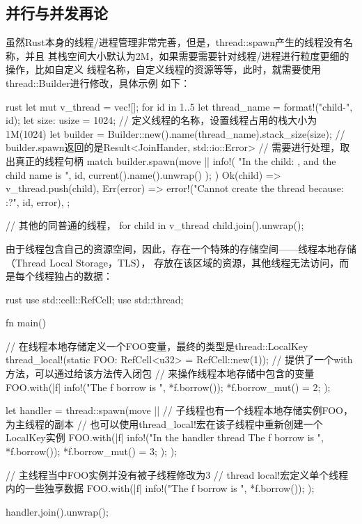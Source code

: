 \subsection{并行与并发再论}
虽然Rust本身的线程/进程管理非常完善，但是，thread::spawn产生的线程没有名称，并且
其栈空间大小默认为2M，如果需要需要针对线程/进程进行粒度更细的操作，比如自定义
线程名称，自定义线程的资源等等，此时，就需要使用thread::Builder进行修改，具体示例
如下：
\begin{code-block}{rust}
let mut v_thread = vec![];
for id in 1..5 {
    let thread_name = format!("child-{}", id);
    let size: usize = 1024;
    // 定义线程的名称，设置线程占用的栈大小为1M(1024)
    let builder = Builder::new().name(thread_name).stack_size(size);
    // builder.spawn返回的是Result<JoinHander, std::io::Error>
    // 需要进行处理，取出真正的线程句柄
    match builder.spawn(move || {
        info!(
            "In the child: {}, and the child name is {}",
            id,
            current().name().unwrap()
        );
    }) {
        Ok(child) => v_thread.push(child),
        Err(error) => error!("Cannot create the thread {} because: {:?}", id, error),
    };
}

// 其他的同普通的线程，
for child in v_thread {
    child.join().unwrap();
}
\end{code-block}

由于线程包含自己的资源空间，因此，存在一个特殊的存储空间——线程本地存储（Thread Local Storage，TLS），
存放在该区域的资源，其他线程无法访问，而是每个线程独占的数据：
\begin{code-block}{rust}
use std::cell::RefCell;
use std::thread;

fn main() {
    // 在线程本地存储定义一个FOO变量，最终的类型是thread::LocalKey
    thread_local!(static FOO: RefCell<u32> = RefCell::new(1));
    // 提供了一个with方法，可以通过给该方法传入闭包
    // 来操作线程本地存储中包含的变量
    FOO.with(|f| {
        info!("The f borrow is {}", *f.borrow());
        *f.borrow_mut() = 2;
    });

    let handler = thread::spawn(move || {
        // 子线程也有一个线程本地存储实例FOO，为主线程的副本
        // 也可以使用thread_local!宏在该子线程中重新创建一个LocalKey实例
        FOO.with(|f| {
            info!("In the handler thread The f borrow is {}", *f.borrow());
            *f.borrow_mut() = 3;
        });
    });

    // 主线程当中FOO实例并没有被子线程修改为3
    // thread local!宏定义单个线程内的一些独享数据
    FOO.with(|f| {
        info!("The f borrow is {}", *f.borrow());
    });

    handler.join().unwrap();
}
\end{code-block}


